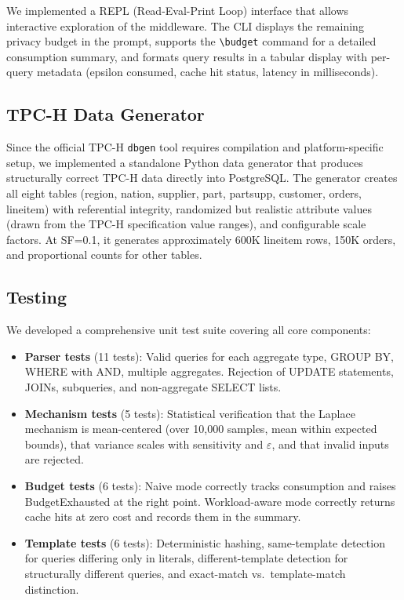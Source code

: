 \documentclass[sigconf,nonacm]{acmart}
\begin{document}
We implemented a REPL (Read-Eval-Print Loop) interface that allows interactive exploration of the middleware. The CLI displays the remaining privacy budget in the prompt, supports the \texttt{\textbackslash budget} command for a detailed consumption summary, and formats query results in a tabular display with per-query metadata (epsilon consumed, cache hit status, latency in milliseconds).

\subsection{TPC-H Data Generator}

Since the official TPC-H \texttt{dbgen} tool requires compilation and platform-specific setup, we implemented a standalone Python data generator that produces structurally correct TPC-H data directly into PostgreSQL. The generator creates all eight tables (region, nation, supplier, part, partsupp, customer, orders, lineitem) with referential integrity, randomized but realistic attribute values (drawn from the TPC-H specification value ranges), and configurable scale factors. At SF=0.1, it generates approximately 600K lineitem rows, 150K orders, and proportional counts for other tables.

\subsection{Testing}

We developed a comprehensive unit test suite covering all core components:

\begin{itemize}
    \item \textbf{Parser tests} (11 tests): Valid queries for each aggregate type, GROUP BY, WHERE with AND, multiple aggregates. Rejection of UPDATE statements, JOINs, subqueries, and non-aggregate SELECT lists.
    \item \textbf{Mechanism tests} (5 tests): Statistical verification that the Laplace mechanism is mean-centered (over 10,000 samples, mean within expected bounds), that variance scales with sensitivity and $\varepsilon$, and that invalid inputs are rejected.
    \item \textbf{Budget tests} (6 tests): Naive mode correctly tracks consumption and raises BudgetExhausted at the right point. Workload-aware mode correctly returns cache hits at zero cost and records them in the summary.
    \item \textbf{Template tests} (6 tests): Deterministic hashing, same-template detection for queries differing only in literals, different-template detection for structurally different queries, and exact-match vs.\ template-match distinction.
\end{itemize}
\end{document}
